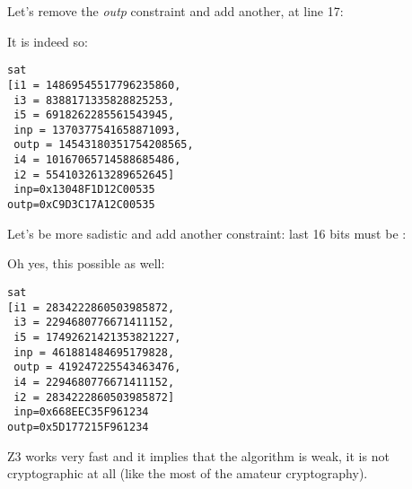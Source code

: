 Let's remove the \textit{outp} constraint and add another, at line 17:



It is indeed so:

\begin{lstlisting}
sat
[i1 = 14869545517796235860,
 i3 = 8388171335828825253,
 i5 = 6918262285561543945,
 inp = 1370377541658871093,
 outp = 14543180351754208565,
 i4 = 10167065714588685486,
 i2 = 5541032613289652645]
 inp=0x13048F1D12C00535
outp=0xC9D3C17A12C00535
\end{lstlisting}

Let's be more sadistic and add another constraint: last 16 bits must be :



Oh yes, this possible as well:

\begin{lstlisting}
sat
[i1 = 2834222860503985872,
 i3 = 2294680776671411152,
 i5 = 17492621421353821227,
 inp = 461881484695179828,
 outp = 419247225543463476,
 i4 = 2294680776671411152,
 i2 = 2834222860503985872]
 inp=0x668EEC35F961234
outp=0x5D177215F961234
\end{lstlisting}

Z3 works very fast and it implies that the algorithm is weak, it is not cryptographic at all
(like the most of the amateur cryptography).

